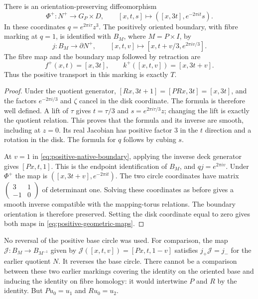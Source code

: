 \begin{theorem}\label{thm:positive-geometry}
There is an orientation-preserving diffeomorphism
\begin{equation}\label{eq:positive-product}
 \Phi^+:N^+\longrightarrow G_P\times D,
 \qquad [x,t,s]\longmapsto([x,3t],e^{-2\pi it}s).
\end{equation}
In these coordinates $q=e^{2\pi i\tau}z^3$.
The positively oriented boundary, with fibre marking at $q=1$,
is identified with $B_M$, where $M=P\times I$, by
\begin{equation}\label{eq:positive-native-boundary}
 j:B_M\longrightarrow\partial N^+,
 \qquad [x,t,v]\longmapsto[x,t+v/3,e^{2\pi iv/3}].
\end{equation}
The fibre map and the boundary map followed by retraction are
\begin{equation}\label{eq:positive-geometric-maps}
 f^+(x,t)=[x,3t],\qquad
 k^+([x,t,v])=[x,3t+v].
\end{equation}
Thus the positive transport in this marking is exactly $T$.
\end{theorem}
\begin{proof}
Under the quotient generator,
$[Rx,3t+1]=[PRx,3t]=[x,3t]$, and the factors
$e^{-2\pi i/3}$ and $\zeta$ cancel in the disk coordinate.
The formula is therefore well defined. A lift of $\tau$ gives
$t=\tau/3$ and $s=e^{2\pi i\tau/3}z$; changing the lift is exactly
the quotient relation. This proves that the formula and its inverse
are smooth, including at $z=0$. Its real Jacobian has positive
factor $3$ in the $t$ direction and a rotation in the disk.
The formula for $q$ follows by cubing $s$.

At $v=1$ in \eqref{eq:positive-native-boundary}, applying the inverse
deck generator gives $[Px,t,1]$. This is the endpoint identification
of $B_M$, and $qj=e^{2\pi iv}$. Under $\Phi^+$ the map is
$([x,3t+v],e^{-2\pi it})$. The two circle coordinates have matrix
$\left(\begin{smallmatrix}3&1\\-1&0\end{smallmatrix}\right)$
of determinant one. Solving these coordinates as before gives a
smooth inverse compatible with the mapping-torus relations.
The boundary orientation is therefore preserved. Setting the disk
coordinate equal to zero gives both maps in
\eqref{eq:positive-geometric-maps}.
\end{proof}

No reversal of the positive base circle was used. For comparison,
the map $\mathcal J:B_M\to B_{M^{-1}}$ given by
$\mathcal J([x,t,v])=[Px,t,1-v]$ satisfies
$j_+\mathcal J=j_-$ for the earlier quotient $N$. It reverses the
base circle. There cannot be a comparison between these two earlier
markings covering the identity on the oriented base and inducing
the identity on fibre homology: it would intertwine $P$ and $R$
by the identity. But $Pu_0=u_1$ and $Ru_0=u_2$.

